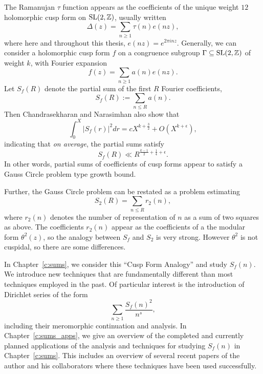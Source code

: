 The Ramanujan $\tau$ function appears as the coefficients of the unique weight $12$
holomorphic cusp form on $\operatorname{SL}(2, \mathbb{Z})$, usually written
\begin{equation}
  \Delta(z) = \sum_{n \geq 1} \tau(n) e(nz),
\end{equation}
where here and throughout this thesis, $e(nz) = e^{2\pi i n z}$.
Generally, we can consider a holomorphic cusp form $f$ on a congruence subgroup $\Gamma
\subseteq \operatorname{SL}(2, \mathbb{Z})$ of weight $k$, with Fourier expansion
\begin{equation}
  f(z) = \sum_{n \geq 1} a(n) e(nz).
\end{equation}
Let $S_f(R)$ denote the partial sum of the first $R$ Fourier coefficients,
\begin{equation}
  S_f(R) := \sum_{n \leq R} a(n).
\end{equation}
Then Chandrasekharan and Narasimhan also show that
\begin{equation}
  \int_0^X \lvert S_f(r) \rvert^2 dr = c X^{k + \frac{3}{2}} + O(X^{k + \epsilon}),
\end{equation}
indicating that \emph{on average}, the partial sums satisfy
\begin{equation}
  S_f(R) \ll R^{\frac{k-1}{2} + \frac{1}{4} + \epsilon}.
\end{equation}
In other words, partial sums of coefficients of cusp forms appear to satisfy a Gauss
Circle problem type growth bound.





Further, the Gauss Circle problem can be restated as a problem estimating
\begin{equation}
  S_2(R) = \sum_{n \leq R} r_2(n),
\end{equation}
where $r_2(n)$ denotes the number of representation of $n$ as a sum of two squares as
above.
The coefficients $r_2(n)$ appear as the coefficients of a the modular form $\theta^2(z)$,
so the analogy between $S_f$ and $S_2$ is very strong.
However $\theta^2$ is not cuspidal, so there are some differences.



In Chapter~\ref{c:sums}, we consider this ``Cusp Form Analogy'' and study $S_f(n)$.
We introduce new techniques that are fundamentally different than most techniques employed
in the past.
Of particular interest is the introduction of Dirichlet series of the form
\begin{equation}
  \sum_{n \geq 1} \frac{S_f(n)^2}{n^s},
\end{equation}
including their meromorphic continuation and analysis.
In Chapter~\ref{c:sums_apps}, we give an overview of the completed and currently planned
applications of the analysis and techniques for studying $S_f(n)$ in Chapter~\ref{c:sums}.
This includes an overview of several recent papers of the author and his collaborators
where these techniques have been used successfully.






